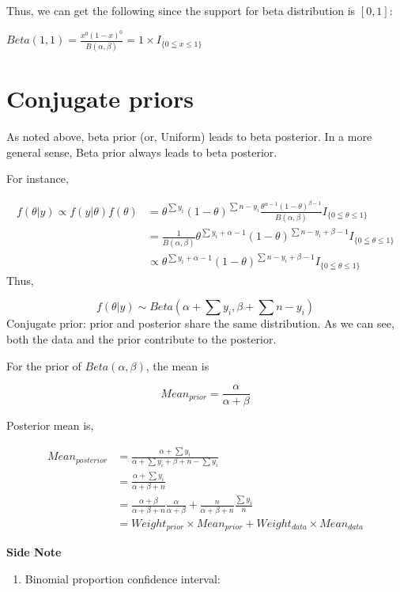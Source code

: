 \documentclass[]{book}
\providecommand{\tightlist}{%
  \setlength{\itemsep}{0pt}\setlength{\parskip}{0pt}}
\begin{document}
Thus, we can get the following since the support for beta distribution is \([0,1]\):

\(Beta(1,1)=\frac{x^0(1-x)^0}{B(\alpha,\beta)}=1\times I_{\{0 \leqq x \leqslant 1\}}\)

\hypertarget{conjugate-priors}{%
\section{Conjugate priors}\label{conjugate-priors}}

As noted above, beta prior (or, Uniform) leads to beta posterior. In a more general sense, Beta prior always leads to beta posterior.

For instance,

\[\begin{aligned} f(\theta |y) \propto f(y|\theta)f(\theta)&=\theta^{\sum y_i}(1-\theta)^{\sum n-y_i}\frac{\theta^{\alpha-1}(1-\theta)^{\beta-1}}{B(\alpha,\beta)} I_{\{0 \leqq \theta \leqslant 1\}} \\ &=\frac{1}{B(\alpha, \beta)}\theta^{\sum y_i+\alpha-1}(1-\theta)^{\sum n-y_i+\beta-1} I_{\{0 \leqq \theta \leqslant 1\}} \\ &\propto  \theta^{\sum y_i+\alpha-1}(1-\theta)^{\sum n-y_i+\beta-1} I_{\{0 \leqq \theta \leqslant 1\}} \end{aligned}\]
Thus,

\[f(\theta |y) \sim Beta(\alpha+\sum y_i,\beta+\sum n-y_i)\]
Conjugate prior: prior and posterior share the same distribution.
As we can see, both the data and the prior contribute to the posterior.

For the prior of \(Beta(\alpha, \beta)\), the mean is

\[Mean_{prior}=\frac{\alpha}{\alpha+\beta}\]

Posterior mean is,

\[\begin{aligned} Mean_{posterior}&= \frac{\alpha+\sum y_i}{\alpha+\sum y_i+\beta+n-\sum y_i} \\ &=\frac{\alpha+\sum y_i}{\alpha+\beta+n} \\ &= \frac{\alpha+\beta}{\alpha+\beta+n}\frac{\alpha}{\alpha+\beta}+\frac{n}{\alpha+\beta+n}\frac{\sum y_i}{n} \\ &= Weight_{prior} \times Mean_{prior}+Weight_{data} \times Mean_{data}\end{aligned}\]

\textbf{Side Note}

\begin{enumerate}
\def\labelenumi{(\arabic{enumi})}
\tightlist
\item
  Binomial proportion confidence interval:
\end{enumerate}
\end{document}

